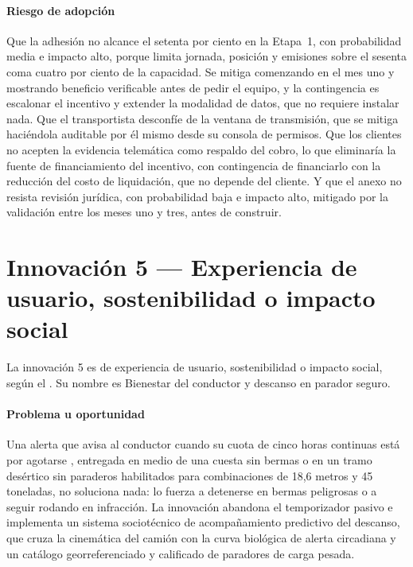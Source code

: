 \paragraph{Riesgo de adopción} Que la adhesión no alcance el setenta por ciento en la Etapa~1, con
probabilidad media e impacto alto, porque limita jornada, posición y emisiones sobre el sesenta coma
cuatro por ciento de la capacidad. Se mitiga comenzando en el mes uno y mostrando beneficio verificable
antes de pedir el equipo, y la contingencia es escalonar el incentivo y extender la modalidad de datos,
que no requiere instalar nada. Que el transportista desconfíe de la ventana de transmisión, que se
mitiga haciéndola auditable por él mismo desde su consola de permisos. Que los clientes no acepten la
evidencia telemática como respaldo del cobro, lo que eliminaría la fuente de financiamiento del
incentivo, con contingencia de financiarlo con la reducción del costo de liquidación, que no depende
del cliente. Y que el anexo no resista revisión jurídica, con probabilidad baja e impacto alto,
mitigado por la validación entre los meses uno y tres, antes de construir.

\section{Innovación 5 — Experiencia de usuario, sostenibilidad o impacto social}\label{sec:13-innovacion-5}

La innovación 5 es de experiencia de usuario, sostenibilidad o impacto social, según el .
Su nombre es Bienestar del conductor y descanso en parador seguro.

\paragraph{Problema u oportunidad} Una alerta que avisa al conductor cuando su cuota de cinco horas
continuas está por agotarse \parencite{codigo_trabajo_25bis}, entregada en medio de una cuesta sin
bermas o en un tramo desértico sin paraderos habilitados para combinaciones de 18,6 metros y 45
toneladas, no soluciona nada: lo fuerza a detenerse en bermas peligrosas o a seguir rodando en
infracción. La innovación abandona el temporizador pasivo e implementa un sistema sociotécnico de
acompañamiento predictivo del descanso, que cruza la cinemática del camión con la curva biológica de
alerta circadiana y un catálogo georreferenciado y calificado de paradores de carga pesada.

